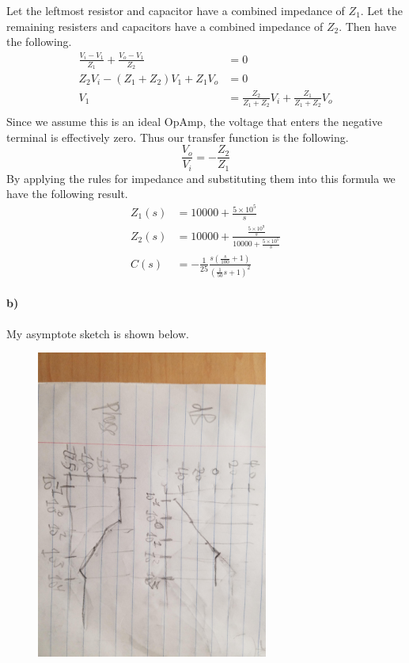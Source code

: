 \documentclass[12pt]{article}
\begin{document}
Let the leftmost resistor and capacitor have a combined impedance of \(Z_1\). Let
the remaining resisters and capacitors have a combined impedance of \(Z_2\). Then have the following.
\begin{align*}
    \frac{V_i-V_1}{Z_1}+\frac{V_o-V_1}{Z_2}&=0\\
    Z_2V_i-(Z_1+Z_2)V_1+Z_1V_o&=0\\
    V_1&=\frac{Z_2}{Z_1+Z_2}V_i + \frac{Z_1}{Z_1+Z_2}V_o\\
\end{align*}
Since we assume this is an ideal OpAmp, the voltage that enters the negative terminal is effectively zero.
Thus our transfer function is the following.
\[\frac{V_o}{V_i}=-\frac{Z_2}{Z_1}\]
By applying the rules for impedance and substituting them into this formula we have the following result.
\begin{align*}
    Z_1(s)&=10000+\frac{5\times10^5}{s}\\
    Z_2(s)&=10000+\frac{\frac{5\times10^{9}}{s}}{10000 +\frac{5\times10^5}{s}}\\
    C(s)&=-\frac{1}{25}\frac{s\left(\frac{s}{100}+1\right)}{\left(\frac{1}{50}s+1\right)^2}
\end{align*}

\paragraph{b)}

My asymptote sketch is shown below.
\begin{figure}[H]
    \begin{center}
        \includegraphics[width=3in]{problem4b.jpg}
    \end{center}
\end{figure}
\end{document}
